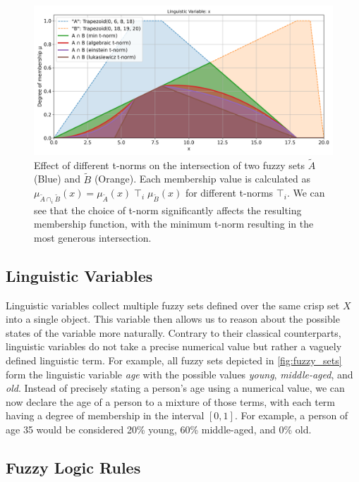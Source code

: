 \begin{figure}[H]
      \centering
      \includegraphics[width=0.9\columnwidth,trim={0 0 0 0.85cm},clip]{figures/Intro/tnorms.png}
      \caption[Effect of different t-norms on the intersection of two fuzzy sets]{Effect of different t-norms on the intersection of two fuzzy sets $\tilde{A}$ (Blue) and $\tilde{B}$ (Orange). Each membership value is calculated as  $\mu_{{\tilde{A} \cap_{i} \tilde{B}}}(x) = \mu_{\tilde{A}}(x) \; \top_{i} \; \mu_{\tilde{B}}(x)$ for different t-norms $\top_{i}$.
            We can see that the choice of t-norm significantly affects the resulting membership function, with the minimum t-norm resulting in the most generous intersection.}
      \label{fig:tnorms}
\end{figure}


\subsection{Linguistic Variables}

Linguistic variables collect multiple fuzzy sets defined over the same crisp set $X$ into a single object. This variable then allows us to reason about the possible states of the variable more naturally.
Contrary to their classical counterparts, linguistic variables do not take a precise numerical value but rather a vaguely defined linguistic term.
For example, all fuzzy sets depicted in \autoref{fig:fuzzy_sets} form the linguistic variable \emph{age} with the possible values \emph{young}, \emph{middle-aged}, and \emph{old}. Instead of precisely stating a person's age using a numerical value, we can now declare the age of a person to a mixture of those terms, with each term having a degree of membership in the interval $[0, 1]$. For example, a person of age 35 would be considered 20\% young, 60\% middle-aged, and 0\% old.


\subsection{Fuzzy Logic Rules}

